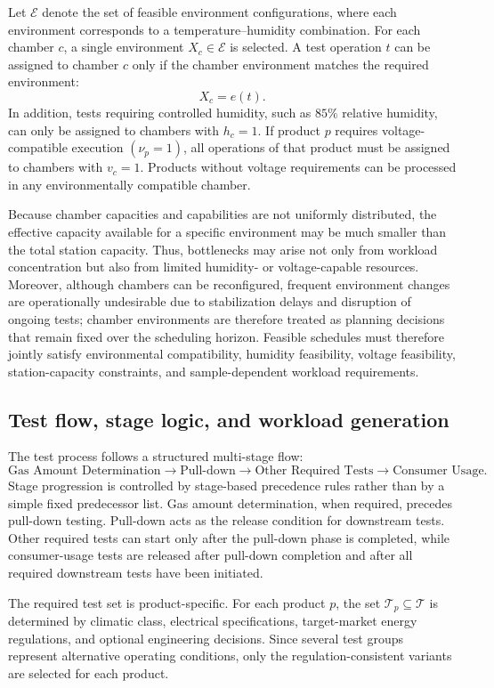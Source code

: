 \documentclass[11pt]{article}
\begin{document}
Let \(\mathcal{E}\) denote the set of feasible environment configurations, where each environment corresponds to a temperature--humidity combination. For each chamber \(c\), a single environment \(X_c\in\mathcal{E}\) is selected. A test operation \(t\) can be assigned to chamber \(c\) only if the chamber environment matches the required environment:
\[
X_c=e(t).
\]
In addition, tests requiring controlled humidity, such as \(85\%\) relative humidity, can only be assigned to chambers with \(h_c=1\). If product \(p\) requires voltage-compatible execution \((\nu_p=1)\), all operations of that product must be assigned to chambers with \(v_c=1\). Products without voltage requirements can be processed in any environmentally compatible chamber.

Because chamber capacities and capabilities are not uniformly distributed, the effective capacity available for a specific environment may be much smaller than the total station capacity. Thus, bottlenecks may arise not only from workload concentration but also from limited humidity- or voltage-capable resources. Moreover, although chambers can be reconfigured, frequent environment changes are operationally undesirable due to stabilization delays and disruption of ongoing tests; chamber environments are therefore treated as planning decisions that remain fixed over the scheduling horizon. Feasible schedules must therefore jointly satisfy environmental compatibility, humidity feasibility, voltage feasibility, station-capacity constraints, and sample-dependent workload requirements.
\subsection{Test flow, stage logic, and workload generation}
\label{subsec:test_logic}

The test process follows a structured multi-stage flow:
\[
\text{Gas Amount Determination}
\rightarrow
\text{Pull-down}
\rightarrow
\text{Other Required Tests}
\rightarrow
\text{Consumer Usage}.
\]
Stage progression is controlled by stage-based precedence rules rather than by a simple fixed predecessor list. Gas amount determination, when required, precedes pull-down testing. Pull-down acts as the release condition for downstream tests. Other required tests can start only after the pull-down phase is completed, while consumer-usage tests are released after pull-down completion and after all required downstream tests have been initiated.

The required test set is product-specific. For each product \(p\), the set \(\mathcal{T}_p\subseteq\mathcal{T}\) is determined by climatic class, electrical specifications, target-market energy regulations, and optional engineering decisions. Since several test groups represent alternative operating conditions, only the regulation-consistent variants are selected for each product.
\end{document}
